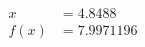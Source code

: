 \documentclass[preview]{standalone}
\begin{document}
\begin{align*}
x &= 4.8488\\f(x) &= 7.9971196
\end{align*}
\end{document}
